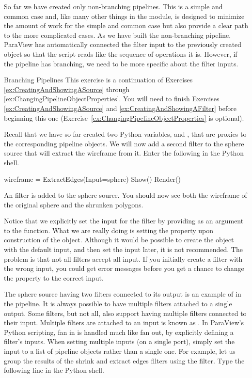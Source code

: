 So far we have created only non-branching pipelines.  This is a simple and
common case and, like many other things in the 
module, is designed to minimize the amount of work for the simple and
common case but also provide a clear path to the more complicated cases.
As we have built the non-branching pipeline, ParaView has automatically
connected the filter input to the previously created object so that the
script reads like the sequence of operations it is.  However, if the
pipeline has branching, we need to be more specific about the filter
inputs.

\begin{exercise}{Branching Pipelines}
  \label{ex:BranchingPipelines}%
  This exercise is a continuation of Exercises
  \ref{ex:CreatingAndShowingASource} through
  \ref{ex:ChangingPipelineObjectProperties}.  You will need to finish
  Exercises \ref{ex:CreatingAndShowingASource} and
  \ref{ex:CreatingAndShowingAFilter} before beginning this one
  (Exercise~\ref{ex:ChangingPipelineObjectProperties} is optional).

  Recall that we have so far created two Python variables, 
  and , that are proxies to the corresponding pipeline
  objects.  We will now add a second filter to the sphere source that will
  extract the wireframe from it.  Enter the following in the Python shell.

  \begin{python}
wireframe = ExtractEdges(Input=sphere)
Show()
Render()
  \end{python}

  An  filter is added to the sphere source.  You should
  now see both the wireframe of the original sphere and the shrunken
  polygons.

  Notice that we explicitly set the input for the 
  filter by providing  as an argument to the
   function.  What we are really doing is setting the
   property upon construction of the object.  Although it
  would be possible to create the object with the default input, and then
  set the input later, it is not recommended.  The problem is that not all
  filters accept all input.  If you initially create a filter with the
  wrong input, you could get error messages before you get a chance to
  change the  property to the correct input.

  The sphere source having two filters connected to its output is an
  example of  in the pipeline.  It is always possible to
  have multiple filters attached to a single output.  Some filters, but not
  all, also support having multiple filters connected to their input.
  Multiple filters are attached to an input is known as .
  In ParaView's Python scripting, fan in is handled much like fan out, by
  explicitly defining a filter's inputs.  When setting multiple inputs (on
  a single port), simply set the input to a list of pipeline objects rather
  than a single one.  For example, let us group the results of the shrink
  and extract edges filters using the  filter.  Type
  the following line in the Python shell.


\end{exercise}
